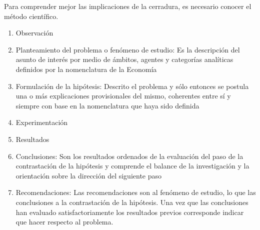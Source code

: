 Para comprender mejor las implicaciones de la cerradura, es necesario conocer el método científico.
\begin{enumerate}
    \item Observación
    \item Planteamiento del problema o fenómeno de estudio: Es la descripción del asunto de interés por medio de ámbitos, agentes y categorías analíticas definidos por la nomenclatura de la Economía
    \item Formulación de la hipótesis: Descrito el problema y sólo entonces se postula una o más explicaciones provisionales del mismo, coherentes entre sí y siempre con base en la nomenclatura que haya sido definida
    \item Experimentación
    \item Resultados
    \item Conclusiones: Son los resultados ordenados de la evaluación del paso de la contrastación de la hipótesis y comprende el balance de la investigación y la orientación sobre la dirección del siguiente paso
    \item Recomendaciones: Las recomendaciones son al fenómeno de estudio, lo que las conclusiones a la contrastación de la hipótesis. Una vez que las conclusiones han evaluado satisfactoriamente los resultados previos corresponde indicar que hacer respecto al problema.
\end{enumerate}
